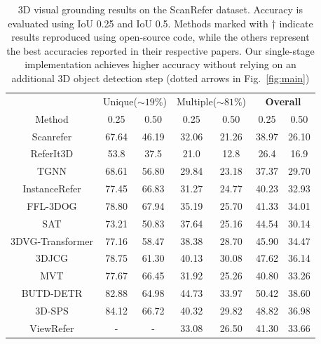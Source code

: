 \documentclass[lettersize,journal]{IEEEtran}
\begin{document}
\begin{table}[h!]
  \begin{center}
    \caption{3D visual grounding results on the ScanRefer dataset. Accuracy is evaluated using IoU 0.25 and IoU 0.5. Methods marked with † indicate results reproduced using open-source code,
    while the others represent the best accuracies reported in their respective papers. Our single-stage implementation achieves higher accuracy without relying on an additional 3D object detection step (dotted arrows in Fig.~\textcolor{red}{\ref{fig:main}})}
    \label{tab: Scanrefer-main}
    \begin{tabular*}{\linewidth}{@{\extracolsep{\fill}} 
    c |c c|c c|c c} %
\toprule
       &    \multicolumn{2}{c|}{Unique($\sim 19\%$)} &  \multicolumn{2}{c|}{Multiple($\sim 81\%$)} &  \multicolumn{2}{c}{\textbf{Overall}}\\
      Method &0.25& 0.50& 0.25& 0.50&0.25& 0.50\\
\midrule
    Scanrefer\cite{scanrefer} & 67.64 & 46.19 & 32.06 & 21.26 & 38.97 & 26.10 \\
    ReferIt3D\cite{Referit3d}   & 53.8 & 37.5 & 21.0 & 12.8 & 26.4 & 16.9 \\
    TGNN\cite{TGNN}     & 68.61 &  56.80 & 29.84 & 23.18 & 37.37 & 29.70 \\
    InstanceRefer\cite{InstanceRefer}   & 77.45 & 66.83 & 31.27 & 24.77 & 40.23 & 32.93 \\
    FFL-3DOG\cite{FFL-3DOG} & 78.80 & 67.94 & 35.19 & 25.70 & 41.33 & 34.01 \\
    SAT\cite{sat} & 73.21 & 50.83 & 37.64 & 25.16 & 44.54 & 30.14 \\ 
    3DVG-Transformer\cite{3dvg} & 77.16 & 58.47 & 38.38 & 28.70 & 45.90 & 34.47\\
    3DJCG\cite{3DJCG} &  78.75 & 61.30 & 40.13 & 30.08 & 47.62 & 36.14\\
    MVT\cite{multiviewtrans}&  77.67 & 66.45 & 31.92 & 25.26 & 40.80 & 33.26\\
    BUTD-DETR\cite{bottom}   & 82.88 & 64.98 & 44.73 & 33.97 & 50.42 & 38.60\\
    3D-SPS\cite{3dsps}   & 84.12 & 66.72 & 40.32 & 29.82 & 48.82 & 36.98\\
    ViewRefer\cite{viewrefer} & -  &-  & 33.08 & 26.50 & 41.30 & 33.66 \\

\end{tabular*}
\end{center}
\end{table}
\end{document}
